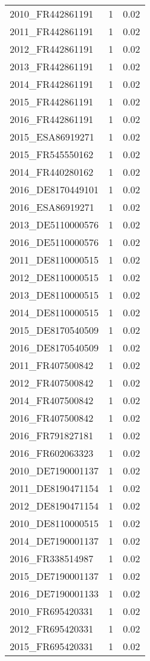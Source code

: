 \begin{table*}[htbp]
\begin{tabular}{lrr}
2010_FR442861191 & 1 & 0.02 \\
2011_FR442861191 & 1 & 0.02 \\
2012_FR442861191 & 1 & 0.02 \\
2013_FR442861191 & 1 & 0.02 \\
2014_FR442861191 & 1 & 0.02 \\
2015_FR442861191 & 1 & 0.02 \\
2016_FR442861191 & 1 & 0.02 \\
2015_ESA86919271 & 1 & 0.02 \\
2015_FR545550162 & 1 & 0.02 \\
2014_FR440280162 & 1 & 0.02 \\
2016_DE8170449101 & 1 & 0.02 \\
2016_ESA86919271 & 1 & 0.02 \\
2013_DE5110000576 & 1 & 0.02 \\
2016_DE5110000576 & 1 & 0.02 \\
2011_DE8110000515 & 1 & 0.02 \\
2012_DE8110000515 & 1 & 0.02 \\
2013_DE8110000515 & 1 & 0.02 \\
2014_DE8110000515 & 1 & 0.02 \\
2015_DE8170540509 & 1 & 0.02 \\
2016_DE8170540509 & 1 & 0.02 \\
2011_FR407500842 & 1 & 0.02 \\
2012_FR407500842 & 1 & 0.02 \\
2014_FR407500842 & 1 & 0.02 \\
2016_FR407500842 & 1 & 0.02 \\
2016_FR791827181 & 1 & 0.02 \\
2016_FR602063323 & 1 & 0.02 \\
2010_DE7190001137 & 1 & 0.02 \\
2011_DE8190471154 & 1 & 0.02 \\
2012_DE8190471154 & 1 & 0.02 \\
2010_DE8110000515 & 1 & 0.02 \\
2014_DE7190001137 & 1 & 0.02 \\
2016_FR338514987 & 1 & 0.02 \\
2015_DE7190001137 & 1 & 0.02 \\
2016_DE7190001133 & 1 & 0.02 \\
2010_FR695420331 & 1 & 0.02 \\
2012_FR695420331 & 1 & 0.02 \\
2015_FR695420331 & 1 & 0.02 \\

\end{tabular}
\end{table*}
